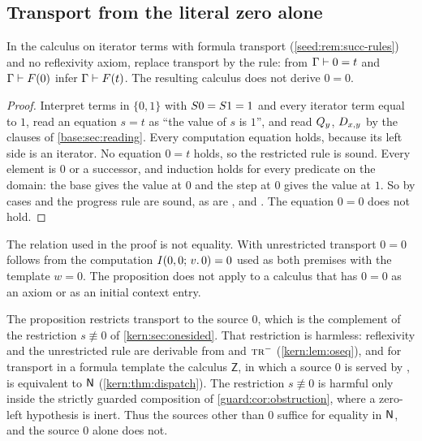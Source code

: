 \subsection{Transport from the literal zero alone}

\begin{proposition}\label{seed:prop:zero-source}
In the calculus on iterator terms with formula transport
(\cref{seed:rem:succ-rules}) and no reflexivity axiom, replace transport by
the rule: from $\Gamma\vdash0=t$ and $\Gamma\vdash F(0)$ infer
$\Gamma\vdash F(t)$. The resulting calculus does not derive $0=0$.
\end{proposition}

\begin{proof}
Interpret terms in $\{0,1\}$ with $S 0=S 1=1$ and every iterator
term equal to $1$, read an equation $s=t$ as ``the value of $s$ is $1$'',
and read $Q_{y}$, $D_{x,y}$ by the clauses of \cref{base:sec:reading}.
Every computation equation holds, because its left side is an iterator. No
equation $0=t$ holds, so the restricted rule is sound. Every element is $0$
or a successor, and induction holds for every predicate on the domain: the
base gives the value at $0$ and the step at $0$ gives the value at $1$. So
 by cases and the progress rule are sound, as are
,  and . The equation $0=0$ does not
hold.
\end{proof}

The relation used in the proof is not equality. With unrestricted transport
$0=0$ follows from the computation $I(0,0;\,v.\,0)=0$ used as both premises
with the template $w=0$. The proposition does not apply to a calculus that
has $0=0$ as an axiom or as an initial context entry.

\begin{remark}
\label{seed:rem:zero-source}
The proposition restricts transport to the source $0$, which is the
complement of the restriction $s\not\equiv0$ of \cref{kern:sec:onesided}.
That restriction is harmless: reflexivity and the unrestricted rule
 are derivable from  and $\rulename{Tr}^{-}$
(\cref{kern:lem:oseq}), and for transport in a formula template the calculus
$\mathsf Z$, in which a source $0$ is served by , is equivalent
to $\mathsf{N}$ (\cref{kern:thm:dispatch}). The restriction $s\not\equiv0$ is
harmful only inside the strictly guarded composition of
\cref{guard:cor:obstruction}, where a zero-left hypothesis is inert. Thus the
sources other than $0$ suffice for equality in $\mathsf{N}$, and the source $0$
alone does not.
\end{remark}

